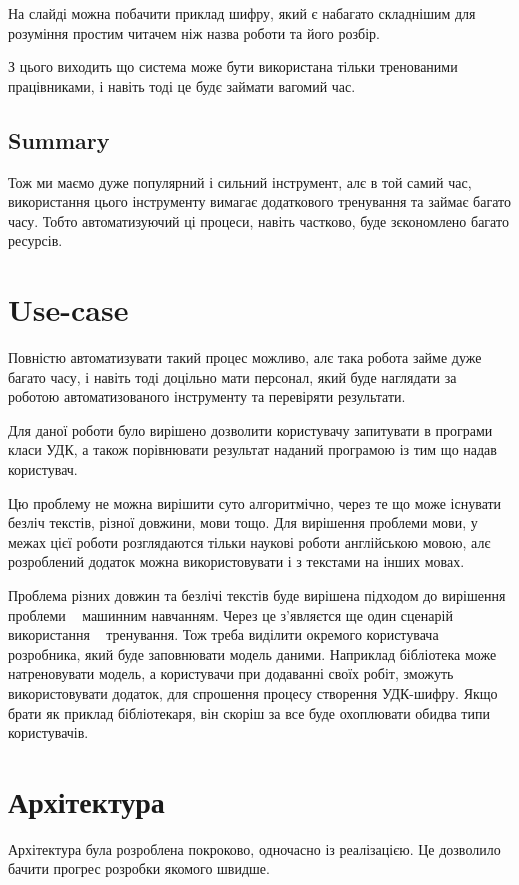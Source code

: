 \documentclass{article}
\let\oldsection\section
\renewcommand{\section}{\clearpage\oldsection}
\begin{document}
На слайді можна побачити приклад шифру,
який є набагато складнішим для розуміння простим читачем ніж назва роботи та його розбір.

З цього виходить що система може бути використана тільки тренованими працівниками,
і навіть тоді це будє займати вагомий час.

\subsection{Summary}
Тож ми маємо дуже популярний і сильний інструмент, алє в той самий час,
використання цього інструменту вимагає додаткового тренування та займає багато часу.
Тобто автоматизуючий ці процеси, навіть частково, буде зєкономлено багато ресурсів.

\section{Use-case}
Повністю автоматизувати такий процес можливо,
алє така робота займе дуже багато часу, і навіть тоді доцільно мати персонал,
який буде наглядати за роботою автоматизованого інструменту та перевіряти результати.

Для даної роботи було вирішено дозволити користувачу запитувати в програми класи УДК,
а також порівнювати результат наданий програмою із тим що надав користувач.

Цю проблему не можна вирішити суто алгоритмічно, через те що може існувати безліч текстів,
різної довжини, мови тощо.
Для вирішення проблеми мови, у межах цієї роботи розглядаются тільки
наукові роботи англійською мовою, алє розроблений додаток можна використовувати
і з текстами на інших мовах.

Проблема різних довжин та безлічі текстів буде вирішена підходом до вирішення проблеми 
\textemdash~ машинним навчанням.
Через це з'являєтся ще один сценарій використання \textemdash~ тренування.
Тож треба виділити окремого користувача \textemdash~ розробника, який буде заповнювати модель даними.
Наприклад бібліотека може натреновувати модель, а користувачи при додаванні своїх робіт,
зможуть використовувати додаток, для спрошення процесу створення УДК-шифру.
Якщо брати як приклад бібліотекаря, він скоріш за все буде охоплювати обидва типи користувачів.

\section{Архітектура}
Архітектура була розроблена покроково, одночасно із реалізацією.
Це дозволило бачити прогрес розробки якомого швидше.
\end{document}
